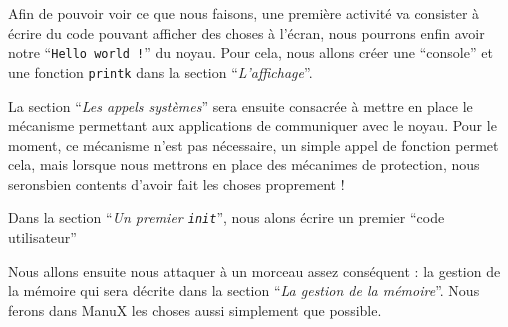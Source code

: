    Afin de pouvoir voir ce que nous faisons, une première activité va
consister à écrire du code pouvant afficher des choses à l'écran, nous
pourrons enfin avoir notre ``{\tt Hello world !}'' du noyau. Pour
cela, nous allons créer une ``console'' et une fonction
\lstinline!printk! dans la section ``{\em L'affichage}''.

   La section ``{\em Les appels systèmes}'' sera ensuite consacrée à
mettre en place le mécanisme permettant aux applications de
communiquer avec le noyau. Pour le moment, ce mécanisme n'est pas
nécessaire, un simple appel de fonction permet cela, mais lorsque nous
mettrons en place des mécanimes de protection, nous seronsbien
contents d'avoir fait les choses proprement !

   Dans la section ``{\em Un premier {\tt init}}'', nous alons écrire
un premier ``code utilisateur''

   Nous allons ensuite nous attaquer à un morceau assez conséquent :
la gestion de la mémoire qui sera décrite dans la section ``{\em La
  gestion de la mémoire}''. Nous ferons dans ManuX les choses aussi
simplement que possible. 
   
